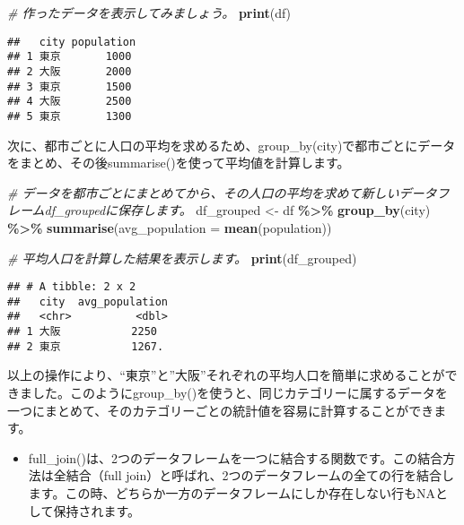 \documentclass[
]{article}
\newenvironment{Shaded}{\begin{snugshade}}{\end{snugshade}}
\newcommand{\AttributeTok}[1]{\textcolor[rgb]{0.13,0.29,0.53}{#1}}
\newcommand{\CommentTok}[1]{\textcolor[rgb]{0.56,0.35,0.01}{\textit{#1}}}
\newcommand{\FunctionTok}[1]{\textcolor[rgb]{0.13,0.29,0.53}{\textbf{#1}}}
\newcommand{\NormalTok}[1]{#1}
\newcommand{\OtherTok}[1]{\textcolor[rgb]{0.56,0.35,0.01}{#1}}
\newcommand{\SpecialCharTok}[1]{\textcolor[rgb]{0.81,0.36,0.00}{\textbf{#1}}}
\providecommand{\tightlist}{%
  \setlength{\itemsep}{0pt}\setlength{\parskip}{0pt}}
\begin{document}
\begin{Shaded}
\begin{Highlighting}[]
\CommentTok{\# 作ったデータを表示してみましょう。}
\FunctionTok{print}\NormalTok{(df)}
\end{Highlighting}
\end{Shaded}

\begin{verbatim}
##   city population
## 1 東京       1000
## 2 大阪       2000
## 3 東京       1500
## 4 大阪       2500
## 5 東京       1300
\end{verbatim}

次に、都市ごとに人口の平均を求めるため、group\_by(city)で都市ごとにデータをまとめ、その後summarise()を使って平均値を計算します。

\begin{Shaded}
\begin{Highlighting}[]
\CommentTok{\# データを都市ごとにまとめてから、その人口の平均を求めて新しいデータフレーム\textquotesingle{}df\_grouped\textquotesingle{}に保存します。}
\NormalTok{df\_grouped }\OtherTok{\textless{}{-}}\NormalTok{ df }\SpecialCharTok{\%\textgreater{}\%}
  \FunctionTok{group\_by}\NormalTok{(city) }\SpecialCharTok{\%\textgreater{}\%}
  \FunctionTok{summarise}\NormalTok{(}\AttributeTok{avg\_population =} \FunctionTok{mean}\NormalTok{(population))}
\end{Highlighting}
\end{Shaded}

\begin{Shaded}
\begin{Highlighting}[]
\CommentTok{\# 平均人口を計算した結果を表示します。}
\FunctionTok{print}\NormalTok{(df\_grouped)}
\end{Highlighting}
\end{Shaded}

\begin{verbatim}
## # A tibble: 2 x 2
##   city  avg_population
##   <chr>          <dbl>
## 1 大阪           2250 
## 2 東京           1267.
\end{verbatim}

以上の操作により、``東京''と''大阪''それぞれの平均人口を簡単に求めることができました。このようにgroup\_by()を使うと、同じカテゴリーに属するデータを一つにまとめて、そのカテゴリーごとの統計値を容易に計算することができます。

\begin{itemize}
\tightlist
\item
  full\_join()は、2つのデータフレームを一つに結合する関数です。この結合方法は全結合（full
  join）と呼ばれ、2つのデータフレームの全ての行を結合します。この時、どちらか一方のデータフレームにしか存在しない行もNAとして保持されます。
\end{itemize}
\end{document}
